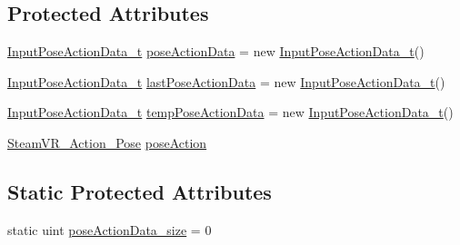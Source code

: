 \subsection*{Protected Attributes}
\begin{DoxyCompactItemize}
\item 
\mbox{\hyperlink{struct_valve_1_1_v_r_1_1_input_pose_action_data__t}{Input\+Pose\+Action\+Data\+\_\+t}} \mbox{\hyperlink{class_valve_1_1_v_r_1_1_steam_v_r___action___pose___source_a78757cd4edeb5f2e67a57cdb6992574c}{pose\+Action\+Data}} = new \mbox{\hyperlink{struct_valve_1_1_v_r_1_1_input_pose_action_data__t}{Input\+Pose\+Action\+Data\+\_\+t}}()
\item 
\mbox{\hyperlink{struct_valve_1_1_v_r_1_1_input_pose_action_data__t}{Input\+Pose\+Action\+Data\+\_\+t}} \mbox{\hyperlink{class_valve_1_1_v_r_1_1_steam_v_r___action___pose___source_a4b4ba298edd6befd45dd711517820e81}{last\+Pose\+Action\+Data}} = new \mbox{\hyperlink{struct_valve_1_1_v_r_1_1_input_pose_action_data__t}{Input\+Pose\+Action\+Data\+\_\+t}}()
\item 
\mbox{\hyperlink{struct_valve_1_1_v_r_1_1_input_pose_action_data__t}{Input\+Pose\+Action\+Data\+\_\+t}} \mbox{\hyperlink{class_valve_1_1_v_r_1_1_steam_v_r___action___pose___source_ac5b188566e843e649476bad50e8d2185}{temp\+Pose\+Action\+Data}} = new \mbox{\hyperlink{struct_valve_1_1_v_r_1_1_input_pose_action_data__t}{Input\+Pose\+Action\+Data\+\_\+t}}()
\item 
\mbox{\hyperlink{class_valve_1_1_v_r_1_1_steam_v_r___action___pose}{Steam\+V\+R\+\_\+\+Action\+\_\+\+Pose}} \mbox{\hyperlink{class_valve_1_1_v_r_1_1_steam_v_r___action___pose___source_ae3e16be44c94dc655964dcad0ee73763}{pose\+Action}}
\end{DoxyCompactItemize}
\subsection*{Static Protected Attributes}
\begin{DoxyCompactItemize}
\item 
static uint \mbox{\hyperlink{class_valve_1_1_v_r_1_1_steam_v_r___action___pose___source_a6797fa10a86039e240ed5e95ba2f739f}{pose\+Action\+Data\+\_\+size}} = 0
\end{DoxyCompactItemize}
